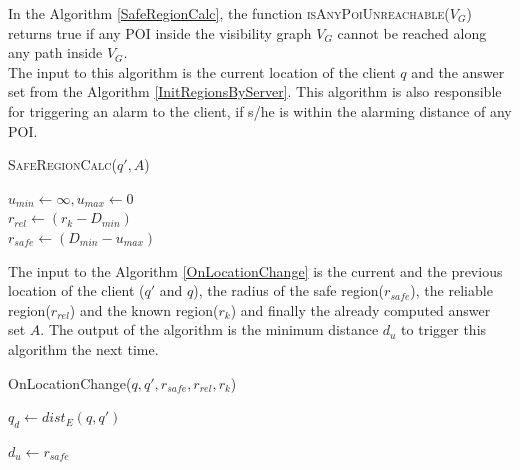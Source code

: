 \documentclass{sig-alternate}
\begin{document}
In the Algorithm \ref{SafeRegionCalc}, the function \textsc{isAnyPoiUnreachable}($V_G$) returns true if any POI inside the visibility graph $V_G$ cannot be reached along any path inside $V_G$. \\
The input to this algorithm is the current location of the client $q$ and the answer set from the Algorithm \ref{InitRegionsByServer}. This algorithm is also responsible for triggering an alarm to the client, if s/he is within the alarming distance of any POI.

\begin{algorithm}
\caption{\textsc{SafeRegionCalc}($q' ,A$)}
\label{SafeRegionCalc}
    
	
	 $u_{min} \gets \infty, u_{max} \gets 0$ \\
	 $r_{rel} \gets ( r_k - D_{min} )$\\
	 \Return $r_{safe} \gets (D_{min} - u_{max})$ 
\end{algorithm}

The input to the Algorithm \ref{OnLocationChange} is the current and the previous location of the client ($q'$ and $q$), the radius of the safe region($r_{safe}$), the reliable region($r_{rel}$) and the known region($r_{k}$) and finally the already computed answer set $A$. The output of the algorithm is the minimum distance $d_u$ to trigger this algorithm the next time.

\begin{algorithm}
\caption{OnLocationChange($q, q', r_{safe}, r_{rel}, r_k$)}
\label{OnLocationChange}
    
    $q_d \gets dist_E(q, q')$
    
    
    \Return $d_u \gets r_{safe}$
\end{algorithm}
\end{document}
